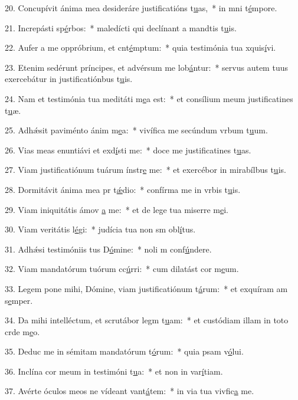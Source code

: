 20. Concupívit ánima mea desideráre justificatións t\uline{u}as,~* in mni t\uline{é}mpore.\par 
21. Increpásti sp\uline{é}rbos:~* maledícti qui declínant a mandtis t\uline{u}is.\par 
22. Aufer a me oppróbrium, et cnt\uline{é}mptum:~* quia testimónia tua xquis\uline{í}vi.\par 
23. Etenim sedérunt príncipes, et advérsum me lob\uline{á}ntur:~* servus autem tuus exercebátur in justificatiónbus t\uline{u}is.\par 
24. Nam et testimónia tua meditáti m\uline{e}a est:~* et consílium meum justificatines t\uline{u}æ.\par 
25. Adhǽsit paviménto ánim m\uline{e}a:~* vivífica me secúndum vrbum t\uline{u}um.\par 
26. Vias meas enuntiávi et exd\uline{í}sti me:~* doce me justificatines t\uline{u}as.\par 
27. Viam justificatiónum tuárum ínstr\uline{e} me:~* et exercébor in mirabílbus t\uline{u}is.\par 
28. Dormitávit ánima mea pr t\uline{ǽ}dio:~* confírma me in vrbis t\uline{u}is.\par 
29. Viam iniquitátis ámov \uline{a} me:~* et de lege tua miserre m\uline{e}i.\par 
30. Viam veritátis l\uline{é}gi:~* judícia tua non sm obl\uline{í}tus.\par 
31. Adhǽsi testimóniis tus D\uline{ó}mine:~* noli m conf\uline{ú}ndere.\par 
32. Viam mandatórum tuórum cc\uline{ú}rri:~* cum dilatást cor m\uline{e}um.\par 
33. Legem pone mihi, Dómine, viam justificatiónum t\uline{á}rum:~* et exquíram am s\uline{e}mper.\par 
34. Da mihi intelléctum, et scrutábor legm t\uline{u}am:~* et custódiam illam in toto crde m\uline{e}o.\par 
35. Deduc me in sémitam mandatórum t\uline{ó}rum:~* quia psam v\uline{ó}lui.\par 
36. Inclína cor meum in testimóni t\uline{u}a:~* et non in var\uline{í}tiam.\par 
37. Avérte óculos meos ne vídeant vant\uline{á}tem:~* in via tua vivfic\uline{a} me.\par 
